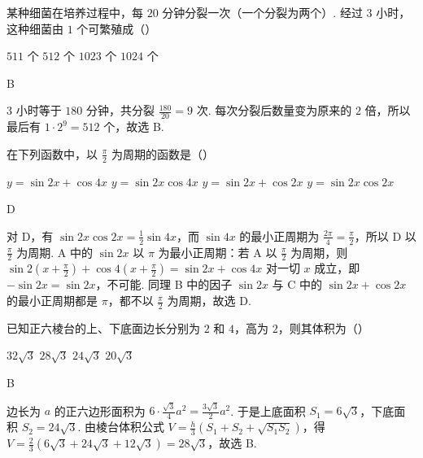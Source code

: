 \begin{problem}
某种细菌在培养过程中，每 \(20\) 分钟分裂一次（一个分裂为两个）. 经过 \(3\) 小时，这种细菌由 \(1\) 个可繁殖成（\quad）

\choices
    {\(511\) 个}
    {\(512\) 个}
    {\(1023\) 个}
    {\(1024\) 个}
\end{problem}

\begin{answer}
B
\end{answer}

\begin{solution}
\(3\) 小时等于 \(180\) 分钟，共分裂 \(\frac{180}{20} = 9\) 次. 每次分裂后数量变为原来的 \(2\) 倍，所以最后有 \(1 \cdot 2^9 = 512\) 个，故选 B.
\end{solution}

\begin{problem}
在下列函数中，以 \(\frac{\pi}{2}\) 为周期的函数是（\quad）

\choices
    {\(y = \sin 2x + \cos 4x\)}
    {\(y = \sin 2x \cos 4x\)}
    {\(y = \sin 2x + \cos 2x\)}
    {\(y = \sin 2x \cos 2x\)}
\end{problem}

\begin{answer}
D
\end{answer}

\begin{solution}
对 D，有 \(\sin 2x \cos 2x = \frac{1}{2}\sin 4x\)，而 \(\sin 4x\) 的最小正周期为 \(\frac{2\pi}{4} = \frac{\pi}{2}\)，所以 D 以 \(\frac{\pi}{2}\) 为周期.
A 中的 \(\sin 2x\) 以 \(\pi\) 为最小正周期：若 A 以 \(\frac{\pi}{2}\) 为周期，则 \(\sin 2\left(x + \frac{\pi}{2}\right) + \cos 4\left(x + \frac{\pi}{2}\right) = \sin 2x + \cos 4x\) 对一切 \(x\) 成立，即 \(-\sin 2x = \sin 2x\)，不可能. 同理 B 中的因子 \(\sin 2x\) 与 C 中的 \(\sin 2x + \cos 2x\) 的最小正周期都是 \(\pi\)，都不以 \(\frac{\pi}{2}\) 为周期，故选 D.
\end{solution}

\begin{problem}
已知正六棱台的上、下底面边长分别为 \(2\) 和 \(4\)，高为 \(2\)，则其体积为（\quad）

\choices
    {\(32\sqrt{3}\)}
    {\(28\sqrt{3}\)}
    {\(24\sqrt{3}\)}
    {\(20\sqrt{3}\)}
\end{problem}

\begin{answer}
B
\end{answer}

\begin{solution}
边长为 \(a\) 的正六边形面积为 \(6 \cdot \frac{\sqrt{3}}{4}a^2 = \frac{3\sqrt{3}}{2}a^2\). 于是上底面积 \(S_1 = 6\sqrt{3}\)，下底面积 \(S_2 = 24\sqrt{3}\). 由棱台体积公式 \(V = \frac{h}{3}\left(S_1 + S_2 + \sqrt{S_1 S_2}\right)\)，得 \(V = \frac{2}{3}\left(6\sqrt{3} + 24\sqrt{3} + 12\sqrt{3}\right) = 28\sqrt{3}\)，故选 B.
\end{solution}


